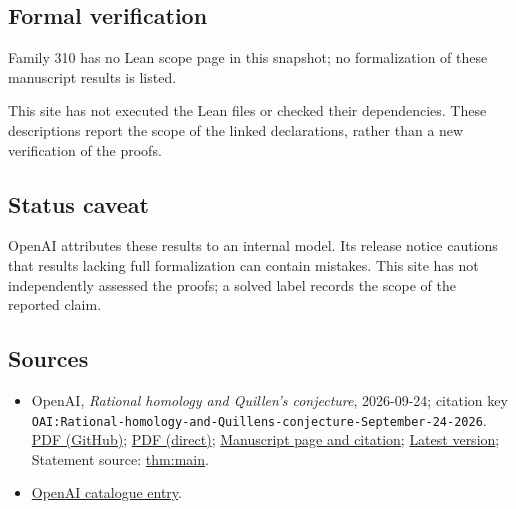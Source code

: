 \documentclass[11pt]{article}
\begin{document}
\subsection{Formal verification}
Family 310 has no Lean scope page in this snapshot; no formalization of these manuscript results is listed.

This site has not executed the Lean files or checked their dependencies. These descriptions report the scope of the linked declarations, rather than a new verification of the proofs.

\subsection{Status caveat}
OpenAI attributes these results to an internal model. Its release notice cautions that results lacking full formalization can contain mistakes. This site has not independently assessed the proofs; a solved label records the scope of the reported claim.

\subsection{Sources}
\begin{itemize}
\item OpenAI, \emph{Rational homology and Quillen's conjecture}, 2026-09-24; citation key \texttt{OAI:Rational-homology-and-Quillens-conjecture-September-24-2026}. \href{https://github.com/openai/math/blob/adc7f1241b42e322a6451854ab7e4b4c146bf78a/preprints/Rational-homology-and-Quillens-conjecture-September-24-2026/paper.pdf}{PDF (GitHub)}; \href{https://github.com/openai/math/raw/adc7f1241b42e322a6451854ab7e4b4c146bf78a/preprints/Rational-homology-and-Quillens-conjecture-September-24-2026/paper.pdf}{PDF (direct)}; \href{https://github.com/openai/math/blob/adc7f1241b42e322a6451854ab7e4b4c146bf78a/preprints/Rational-homology-and-Quillens-conjecture-September-24-2026/README.md}{Manuscript page and citation}; \href{https://github.com/openai/math/blob/main/preprints/Rational-homology-and-Quillens-conjecture-September-24-2026/paper.pdf}{Latest version}; Statement source: \href{https://github.com/openai/math/blob/adc7f1241b42e322a6451854ab7e4b4c146bf78a/preprints/Rational-homology-and-Quillens-conjecture-September-24-2026/build/sections/01-introduction.tex\#L15}{thm:main}.
\item \href{https://github.com/openai/math/blob/adc7f1241b42e322a6451854ab7e4b4c146bf78a/CONTENTS.md}{OpenAI catalogue entry}.
\end{itemize}
\end{document}
